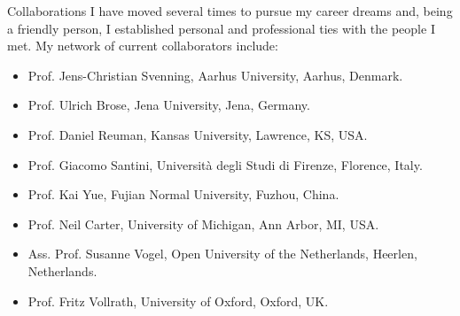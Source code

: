 \documentclass{resume} %
\begin{document}
\begin{rSection}{Collaborations}
I have moved several times to pursue my career dreams and, being a friendly person, I established personal and professional ties with the people I met.
My network of current collaborators include:
\begin{itemize}
\setlength\itemsep{-0.5em}
    \item Prof. Jens-Christian Svenning, Aarhus University, Aarhus, Denmark.
    \item Prof. Ulrich Brose, Jena University, Jena, Germany.
    \item Prof. Daniel Reuman, Kansas University, Lawrence, KS, USA.
    \item Prof. Giacomo Santini, Universit\`{a} degli Studi di Firenze, Florence, Italy.
    \item Prof. Kai Yue, Fujian Normal University, Fuzhou, China.
    \item Prof. Neil Carter, University of Michigan, Ann Arbor, MI, USA.
    \item Ass. Prof. Susanne Vogel, Open University of the Netherlands, Heerlen, Netherlands.
    \item Prof. Fritz Vollrath, University of Oxford, Oxford, UK.
\end{itemize}
\end{rSection}
\end{document}
